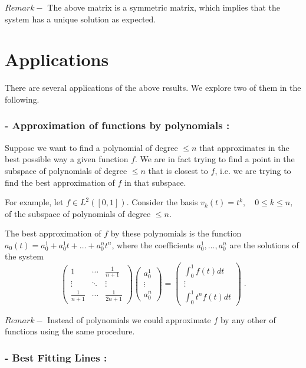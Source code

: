 \documentclass[12pt]{article}
\begin{document}
$Remark - $ The above matrix is a symmetric  matrix, which implies that the system has a unique solution as expected.

\section{Applications}
There are several applications of the above results. We explore two of them in the following.

\subsubsection{ - Approximation of functions by polynomials :}
Suppose we want to find a polynomial of degree $\leq n$ that approximates in the best possible way a given function $f$. We are in fact trying to find a point in the subspace of polynomials of degree $\leq n$ that is closest to $f$, i.e. we are trying to find the best approximation of $f$ in that subspace.

For example, let $f \in L^2([0,1])$. Consider the basis $v_k(t)= t^k ,\quad 0\leq k \leq n, \;$ of the subspace of polynomials of degree $\leq n$.

 The best approximation of $f$ by these polynomials is the function $a_0(t) = a_0^1 +a_0^1 t + \dots + a_0^n t^n$, where the coefficients $a_0^1, \dots, a_0^n$ are the solutions of the system
\begin{displaymath}
\begin{pmatrix}
1 & \cdots & \frac{1}{n+1} \\
\vdots & \ddots & \vdots \\
\frac{1}{n+1} & \cdots & \frac{1}{2n+1}
\end{pmatrix}
\begin{pmatrix}
a_0^1 \\
\vdots \\
a_0^n
\end{pmatrix} = 
\begin{pmatrix}
\int_0^1 f(t)dt\\
\vdots \\
\int_0^1 t^n f(t) dt
\end{pmatrix} \; .
\end{displaymath}

$Remark -$ Instead of polynomials we could approximate $f$ by any other  of functions using the same procedure.

\subsubsection{ - Best Fitting Lines :}
\end{document}
